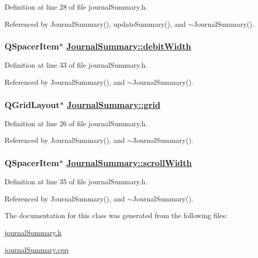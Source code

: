 Definition at line 28 of file journal\-Summary.h.

Referenced by Journal\-Summary(), update\-Summary(), and $\sim$Journal\-Summary().\hypertarget{classJournalSummary_r8}{
\subsubsection[debitWidth]{\setlength{\rightskip}{0pt plus 5cm}QSpacer\-Item$\ast$ \hyperlink{classJournalSummary_r8}{Journal\-Summary::debit\-Width}}}
\label{classJournalSummary_r8}


Definition at line 33 of file journal\-Summary.h.

Referenced by Journal\-Summary(), and $\sim$Journal\-Summary().\hypertarget{classJournalSummary_r1}{
\subsubsection[grid]{\setlength{\rightskip}{0pt plus 5cm}QGrid\-Layout$\ast$ \hyperlink{classJournalSummary_r1}{Journal\-Summary::grid}}}
\label{classJournalSummary_r1}


Definition at line 26 of file journal\-Summary.h.

Referenced by Journal\-Summary(), and $\sim$Journal\-Summary().\hypertarget{classJournalSummary_r10}{
\subsubsection[scrollWidth]{\setlength{\rightskip}{0pt plus 5cm}QSpacer\-Item$\ast$ \hyperlink{classJournalSummary_r10}{Journal\-Summary::scroll\-Width}}}
\label{classJournalSummary_r10}


Definition at line 35 of file journal\-Summary.h.

Referenced by Journal\-Summary(), and $\sim$Journal\-Summary().

The documentation for this class was generated from the following files:\begin{CompactItemize}
\item 
\hyperlink{journalSummary_8h}{journal\-Summary.h}\item 
\hyperlink{journalSummary_8cpp}{journal\-Summary.cpp}\end{CompactItemize}
